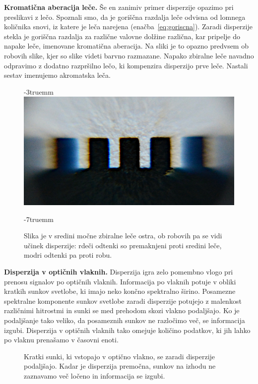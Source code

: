 \begin{example}{\bf Kromatična aberacija leče.} Še en zanimiv primer 
disperzije opazimo pri preslikavi z lečo. 
Spoznali smo, da je goriščna razdalja leče odvisna
od lomnega količnika snovi, iz katere je leča narejena 
(enačba~\ref{eq:goriscna}). Zaradi disperzije stekla
je goriščna razdalja za različne valovne dolžine različna,
kar pripelje do napake leče, imenovane kromatična
aberacija. Na sliki je to opazno predvsem 
ob robovih slike, kjer so slike videti barvno razmazane. 
Napako zbiralne leče navadno odpravimo z dodatno razpršilno lečo, ki kompenzira
disperzijo prve leče. Nastali sestav imenujemo akromatska leča.
\begin{figure}[h!]
\vglue-3truemm
\centering
\includegraphics[width=6truecm]{slike/09_aberacija.jpg}
\caption{Slika je v sredini močne zbiralne leče ostra, ob robovih pa
se vidi učinek disperzije: rdeči odtenki so premaknjeni proti sredini 
leče, modri odtenki pa proti robu.}
\label{fig:09_aberacija}
\vglue-7truemm
\end{figure}

\end{example}

\begin{example}{\bf Disperzija v optičnih vlaknih.}
Disperzija igra zelo pomembno vlogo pri prenosu signalov
po optičnih vlaknih. Informacija po vlaknih potuje
v obliki kratkih sunkov svetlobe, ki imajo neko
končno spektralno širino. Posamezne spektralne 
komponente sunkov svetlobe zaradi disperzije 
potujejo z malenkost različnimi hitrostmi in sunki se 
med prehodom skozi vlakno podaljšajo. Ko je podaljšanje
tako veliko, da posameznih sunkov ne razločimo več, 
se informacija izgubi.  
Disperzija v optičnih vlaknih tako omejuje količino 
podatkov, ki jih lahko po vlaknu prenašamo v časovni enoti.
\begin{figure}[ht]
\centering
\def\svgwidth{130truemm} 

\caption{Kratki sunki, ki vstopajo v optično vlakno, se zaradi 
disperzije podaljšajo. Kadar je disperzija premočna, sunkov
na izhodu ne zaznavamo več ločeno in informacija se izgubi.}
\label{fig:09_disperzijafib}
\end{figure}

\end{example}

